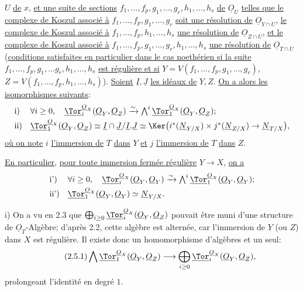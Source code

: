 
\(U\) \uline{de} \(x\), \uline{et une suite de sections} \(f_1,\ldots,f_p,g_1,\ldots,g_r,h_1,\ldots,h_s\) \uline{de} \(\underline{O}_U\) \uline{telles que le complexe de Koszul associé à} \(f_1,\ldots,f_p,g_1,\ldots,g_r\) \uline{soit une résolution de} \(\underline{O}_{Y\cap U}\), \uline{le complexe de Koszul associé à} \(f_1,\ldots,f_p,h_1,\ldots,h_s\) \uline{une résolution de} \(\underline{O}_{Z\cap U}\), \uline{et le complexe de Koszul associé à} \(f_1,\ldots,f_p,g_1,\ldots,g_r,h_1,\ldots,h_s\) \uline{une résolution de} \(\underline{O}_{T\cap U}\) (\uline{conditions satisfaites en particulier dans le cas noethérien si la suite} \(f_1,\ldots,f_p,g_1,\ldots g_r,h_1,\ldots,h_s\) \uline{est régulière et si} \(Y=V(f_1,\ldots,f_p,g_1,\ldots,g_r)\), \(Z=V(f_1,\ldots,f_p,h_1,\ldots,h_s)\)). \uline{Soient} \(\underline{I},\underline{J}\) \uline{les idéaux de} \(Y,Z\). \uline{On a alors les isomorphismes suivants}:
\[
\begin{array}{ll}
\text{i)}& \forall i\ge0,\quad
\underline{\Tor}_i^{\underline{O}_X}(\underline{O}_Y,\underline{O}_Z)\xrightarrow{\sim}
\bigwedge^i\underline{\Tor}_1^{\underline{O}_X}(\underline{O}_Y,\underline{O}_Z);\\[0.8ex]
\text{ii)}&
\underline{\Tor}_1^{\underline{O}_X}(\underline{O}_Y,\underline{O}_Z)\simeq
\underline{I}\cap \underline{J}/\underline{I}.\underline{J}\simeq
\Ker\bigl(i^*(\underline{N}_{Y/X})\times j^*(\underline{N}_{Z/X})\to \underline{N}_{T/X}\bigr),
\end{array}
\]
\uline{où on note} \(i\) \uline{l'immersion de} \(T\) \uline{dans} \(Y\) \uline{et} \(j\) \uline{l'immersion de} \(T\) \uline{dans} \(Z\).

\uline{En particulier}, \uline{pour toute immersion fermée régulière} \(Y\to X\), \uline{on a}
\[
\begin{array}{ll}
\text{i')}& \forall i\ge0,\quad
\underline{\Tor}_i^{\underline{O}_X}(\underline{O}_Y,\underline{O}_Y)\xrightarrow{\sim}
\bigwedge^i\underline{\Tor}_1^{\underline{O}_X}(\underline{O}_Y,\underline{O}_Y);\\[0.8ex]
\text{ii')}&
\underline{\Tor}_1^{\underline{O}_X}(\underline{O}_Y,\underline{O}_Y)\simeq \underline{N}_{Y/X}.
\end{array}
\]

i) On a vu en 2.3 que \(\bigoplus_{i\ge0}\underline{\Tor}_i^{\underline{O}_X}(\underline{O}_Y,\underline{O}_Z)\) pouvait être muni d'une structure de \(\underline{O}_T\)-Algèbre; d'après 2.2, cette algèbre est alternée, car l'immersion de \(Y\) (ou \(Z\)) dans \(X\) est régulière. Il existe donc un homomorphisme d'algèbres et un seul:
\begin{equation}\tag{2.5.1}
\bigwedge \underline{\Tor}_1^{\underline{O}_X}(\underline{O}_Y,\underline{O}_Z)\longrightarrow
\bigoplus_{i\ge0}\underline{\Tor}_i^{\underline{O}_X}(\underline{O}_Y,\underline{O}_Z),
\end{equation}
prolongeant l'identité en degré \(1\).

